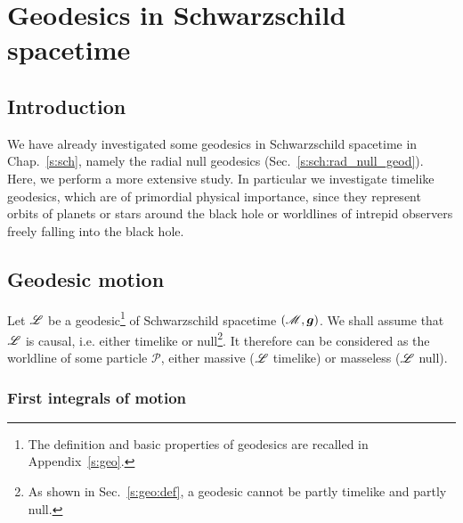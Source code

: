 \chapter{Geodesics in Schwarzschild spacetime}
\label{s:ges}

\minitoc

\section{Introduction}

We have already investigated some geodesics in Schwarzschild spacetime in
Chap.~\ref{s:sch}, namely
the radial null geodesics (Sec.~\ref{s:sch:rad_null_geod}).
Here, we perform a more extensive study. In particular we investigate timelike
geodesics, which are of primordial physical importance, since they represent
orbits of planets or stars around the black hole or worldlines of
intrepid observers freely falling into the black hole.

\section{Geodesic motion}

Let $\mathscr{L}$ be a geodesic\footnote{The definition and basic properties of geodesics
are recalled in Appendix~\ref{s:geo}.} of Schwarzschild spacetime
$(\mathscr{M},\bm{g})$. We shall assume that $\mathscr{L}$ is causal, i.e. either timelike or null\footnote{As
shown in Sec.~\ref{s:geo:def}, a geodesic cannot be partly timelike and partly
null.}. It therefore can be considered as the worldline
of some particle $\mathscr{P}$, either massive
($\mathscr{L}$ timelike) or masseless ($\mathscr{L}$ null).


\subsection{First integrals of motion}

